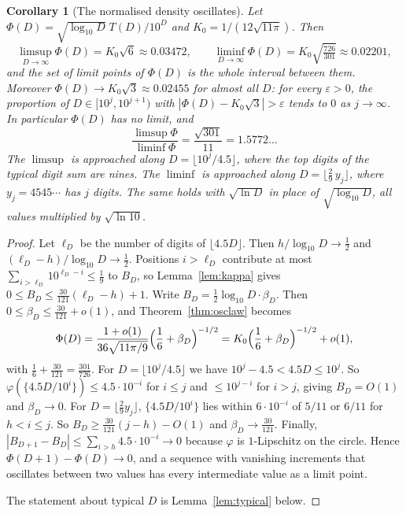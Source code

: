 \documentclass[11pt]{article}
\newtheorem{corollary}[theorem]{Corollary}
\theoremstyle{definition}
\theoremstyle{remark}
\begin{document}
\begin{corollary}[The normalised density oscillates]\label{cor:osc}
Let $\Phi(D)=\sqrt{\log_{10}D}\;T(D)/10^D$ and $K_0=1/(12\sqrt{11\pi})$. Then
\[
  \limsup_{D\to\infty}\Phi(D)=K_0\sqrt6\approx0.03472,\qquad
  \liminf_{D\to\infty}\Phi(D)=K_0\sqrt{\tfrac{726}{301}}\approx0.02201,
\]
and the set of limit points of $\Phi(D)$ is the whole interval between them.
Moreover $\Phi(D)\to K_0\sqrt3\approx0.02455$ for almost all $D$: for every
$\varepsilon>0$, the proportion of $D\in[10^j,10^{j+1})$ with
$|\Phi(D)-K_0\sqrt3|>\varepsilon$ tends to $0$ as $j\to\infty$.
In particular $\Phi(D)$ has no limit, and
\[
  \frac{\limsup\Phi}{\liminf\Phi}=\frac{\sqrt{301}}{11}=1.5772\ldots
\]
The $\limsup$ is approached along $D=\lfloor10^j/4.5\rfloor$, where the top
digits of the typical digit sum are nines. The $\liminf$ is approached along
$D=\lfloor\frac29\,y_j\rfloor$, where $y_j=4545\cdots$ has $j$ digits. The same
holds with $\sqrt{\ln D}$ in place of $\sqrt{\log_{10}D}$, all values multiplied
by $\sqrt{\ln10}$.
\end{corollary}

\begin{proof}
Let $\ell_D$ be the number of digits of $\lfloor4.5D\rfloor$. Then
$h/\log_{10}D\to\frac12$ and $(\ell_D-h)/\log_{10}D\to\frac12$. Positions
$i>\ell_D$ contribute at most $\sum_{i>\ell_D}10^{\ell_D-i}\le\frac19$ to $B_D$,
so Lemma~\ref{lem:kappa} gives
$0\le B_D\le\frac{30}{121}(\ell_D-h)+1$. Write
$B_D=\frac12\log_{10}D\cdot\beta_D$. Then
$0\le\beta_D\le\frac{30}{121}+o(1)$, and Theorem~\ref{thm:osclaw} becomes
\[
  \Phi(D)=\frac{1+o(1)}{36\sqrt{11\pi/9}}\Bigl(\frac16+\beta_D\Bigr)^{-1/2}
  =K_0\Bigl(\frac16+\beta_D\Bigr)^{-1/2}+o(1),
\]
with $\frac16+\frac{30}{121}=\frac{301}{726}$. For $D=\lfloor10^j/4.5\rfloor$
we have $10^j-4.5<4.5D\le10^j$. So $\varphi(\{4.5D/10^i\})\le4.5\cdot10^{-i}$ for
$i\le j$ and $\le10^{j-i}$ for $i>j$, giving $B_D=O(1)$ and $\beta_D\to0$. For
$D=\lfloor\frac29y_j\rfloor$, $\{4.5D/10^i\}$ lies within $6\cdot10^{-i}$ of
$5/11$ or $6/11$ for $h<i\le j$. So $B_D\ge\frac{30}{121}(j-h)-O(1)$ and
$\beta_D\to\frac{30}{121}$. Finally, $|B_{D+1}-B_D|\le\sum_{i>h}4.5\cdot10^{-i}
\to0$ because $\varphi$ is $1$-Lipschitz on the circle. Hence
$\Phi(D+1)-\Phi(D)\to0$, and a sequence with vanishing increments that
oscillates between two values has every intermediate value as a limit point.

The statement about typical $D$ is Lemma~\ref{lem:typical} below.
\end{proof}
\end{document}
